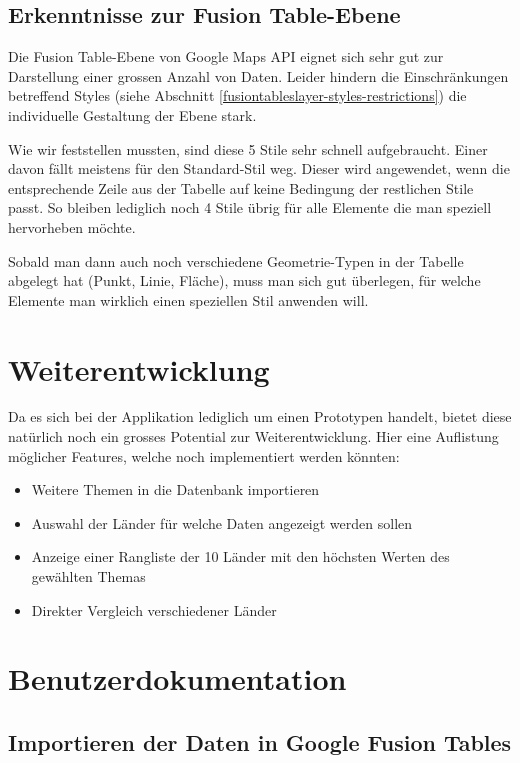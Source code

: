 \subsection{Erkenntnisse zur Fusion Table-Ebene}
Die Fusion Table-Ebene von Google Maps \gls{API} eignet sich sehr gut zur Darstellung einer grossen Anzahl von Daten. Leider hindern die Einschränkungen betreffend Styles (siehe Abschnitt \ref{fusiontableslayer-styles-restrictions}) die individuelle Gestaltung der Ebene stark.

Wie wir feststellen mussten, sind diese 5 Stile sehr schnell aufgebraucht. Einer davon fällt meistens für den Standard-Stil weg. Dieser wird angewendet, wenn die entsprechende Zeile aus der Tabelle auf keine Bedingung der restlichen Stile passt. So bleiben lediglich noch 4 Stile übrig für alle Elemente die man speziell hervorheben möchte.

Sobald man dann auch noch verschiedene Geometrie-Typen in der Tabelle abgelegt hat (Punkt, Linie, Fläche), muss man sich gut überlegen, für welche Elemente man wirklich einen speziellen Stil anwenden will.

\section{Weiterentwicklung}
Da es sich bei der Applikation lediglich um einen Prototypen handelt, bietet diese natürlich noch ein grosses Potential zur Weiterentwicklung. Hier eine Auflistung möglicher Features, welche noch implementiert werden könnten:

\begin{itemize}
\item Weitere Themen in die Datenbank importieren
\item Auswahl der Länder für welche Daten angezeigt werden sollen
\item Anzeige einer Rangliste der 10 Länder mit den höchsten Werten des gewählten Themas
\item Direkter Vergleich verschiedener Länder
\end{itemize}


\section{Benutzerdokumentation}
\subsection{Importieren der Daten in Google Fusion Tables}

